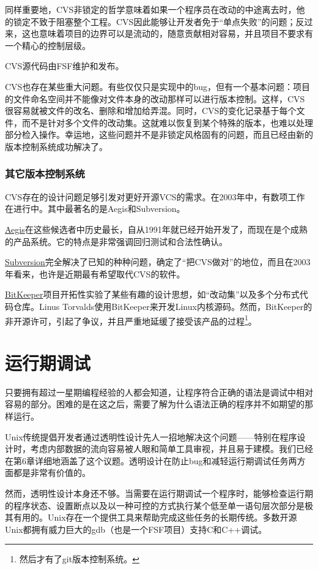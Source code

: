 \documentclass[12pt,oneside]{book}
\begin{document}
\begin{common-format}
同样重要地，CVS非锁定的哲学意味着如果一个程序员在改动的中途离去时，他的锁定不致于阻塞整个工程。CVS因此能够让开发者免于“单点失败”的问题；反过来，这也意味着项目的边界可以是流动的，随意贡献相对容易，并且项目不要求有一个精心的控制层级。

CVS源代码由FSF维护和发布。

CVS也存在某些重大问题。有些仅仅只是实现中的bug，但有一个基本问题：项目的文件命名空间并不能像对文件本身的改动那样可以进行版本控制。这样，CVS很容易就被文件的改名、删除和增加给弄混。同时，CVS的变化记录基于每个文件，而不是针对多个文件的改动集。这就难以恢复到某个特殊的版本，也难以处理部分检入操作。幸运地，这些问题并不是非锁定风格固有的问题，而且已经由新的版本控制系统成功解决了。

\subsubsection{其它版本控制系统}
CVS存在的设计问题足够引发对更好开源VCS的需求。在2003年中，有数项工作在进行中。其中最著名的是Aegis和Subversion。

\href{http://www.pcug.org.au/~millerp/aegis/aegis.html}{Aegis}在这些候选者中历史最长，自从1991年就已经开始开发了，而现在是个成熟的产品系统。它的特点是非常强调回归测试和合法性确认。

\href{http://subversion.tigris.org/}{Subversion}完全解决了已知的种种问题，确定了“把CVS做对”的地位，而且在2003年看来，也许是近期最有希望取代CVS的软件。

\href{http://www.bitkeeper.com/}{BitKeeper}项目开拓性实验了某些有趣的设计思想，如“改动集”以及多个分布式代码仓库。Linus Torvalds使用BitKeeper来开发Linux内核源码。然而，BitKeeper的非开源许可，引起了争议，并且严重地延缓了接受该产品的过程\footnote{然后才有了git版本控制系统。}。

\section{运行期调试}
只要拥有超过一星期编程经验的人都会知道，让程序符合正确的语法是调试中相对容易的部分。困难的是在这之后，需要了解为什么语法正确的程序并不如期望的那样运行。

Unix传统提倡开发者通过透明性设计先人一招地解决这个问题——特别在程序设计时，考虑内部数据的流向容易被人眼和简单工具审视，并且易于建模。我们已经在第6章详细地涵盖了这个议题。透明设计在防止bug和减轻运行期调试任务两方面都是非常有价值的。

然而，透明性设计本身还不够。当需要在运行期调试一个程序时，能够检查运行期的程序状态、设置断点以及以一种可控的方式执行某个低至单一语句层次部分是极其有用的。Unix存在一个提供工具来帮助完成这些任务的长期传统。多数开源Unix都拥有威力巨大的gdb（也是一个FSF项目）支持C和C++调试。


\end{common-format}
\end{document}
